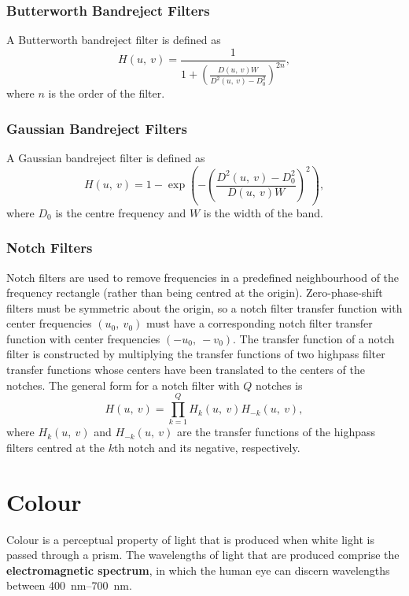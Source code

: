\documentclass{article}
\begin{document}
\subsubsection{Butterworth Bandreject Filters}
A Butterworth bandreject filter is defined as
\begin{equation*}
    H\left( u,\: v \right) = \frac{1}{1 + \left( \frac{D\left( u,\: v \right)W}{D^2\left( u,\: v \right) - D_0^2} \right)^{2n}},
\end{equation*}
where \(n\) is the order of the filter.
\subsubsection{Gaussian Bandreject Filters}
A Gaussian bandreject filter is defined as
\begin{equation*}
    H\left( u,\: v \right) = 1 - \exp{\left( - \left( \frac{D^2\left( u,\: v \right) - D_0^2}{D\left( u,\: v \right)W} \right)^2 \right)},
\end{equation*}
where \(D_0\) is the centre frequency and \(W\) is the width of the band.
\subsubsection{Notch Filters}
Notch filters are used to remove frequencies in a predefined neighbourhood
of the frequency rectangle (rather than being centred at the origin).
Zero-phase-shift filters must be symmetric about the origin, so a notch
filter transfer function with center frequencies \(\left( u_0,\: v_0 \right)\)
must have a corresponding notch filter transfer function with center
frequencies \(\left( -u_0,\: -v_0 \right)\). The transfer function of a
notch filter is constructed by multiplying the transfer functions of two
highpass filter transfer functions whose centers have been translated
to the centers of the notches. The general form for a notch filter with
\(Q\) notches is
\begin{equation*}
    H\left( u,\: v \right) = \prod_{k=1}^Q H_k\left( u,\: v \right) H_{-k}\left( u,\: v \right),
\end{equation*}
where \(H_k\left( u,\: v \right)\) and \(H_{-k}\left( u,\: v \right)\)
are the transfer functions of the highpass filters centred at the
\(k\)th notch and its negative, respectively.
\section{Colour}
Colour is a perceptual property of light that is produced when white
light is passed through a prism. The wavelengths of light that are
produced comprise the \textbf{electromagnetic spectrum}, in which the
human eye can discern wavelengths between \qtyrange[range-phrase={ and }]{400}{700}{nm}.
\end{document}
